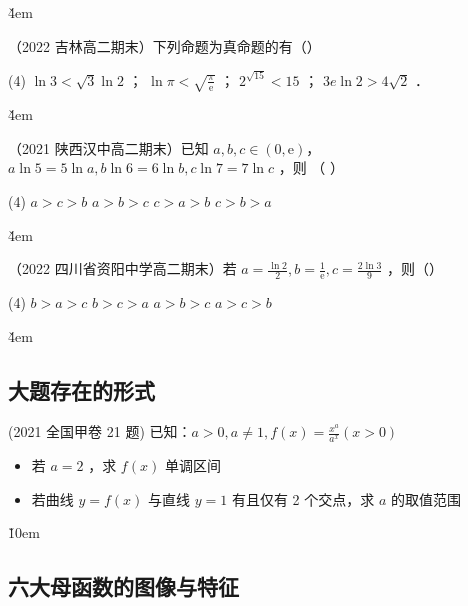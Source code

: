 \v{4em}

\begin{example}
    （2022 吉林高二期末）下列命题为真命题的有（\quad）
    \begin{tasks}(4)
        \task $\ln 3<\sqrt{3} \ln 2$ ；
        \task $\ln \pi<\sqrt{\frac{\pi}{\mathrm{e}}}$ ；
        \task $2^{\sqrt{15}}<15$ ；
        \task $3 e \ln 2>4 \sqrt{2}$ ．
    \end{tasks}
\end{example}

\v{4em}

\begin{example}
    （2021 陕西汉中高二期末）已知 $a, b, c \in (0, \mathrm{e})$，$a \ln 5=5 \ln a, b \ln 6= 6 \ln b, c \ln 7=7 \ln c$ ，则 （ \quad）
    \begin{tasks}(4)
        \task $a>c>b$
        \task $a>b>c$
        \task $c>a>b$
        \task $c>b>a$
    \end{tasks}
\end{example}

\v{4em}

\begin{example}
    （2022 四川省资阳中学高二期末）若 $a=\frac{\ln 2}{2}, b=\frac{1}{\mathrm{e}}, c=\frac{2 \ln 3}{9}$ ，则（\quad ）
    \begin{tasks}(4)
        \task $b>a>c$
        \task $b>c>a$
        \task $a>b>c$
        \task $a>c>b$
    \end{tasks}
\end{example}

\v{4em}

\subsection{大题存在的形式}

\begin{example}
    (2021 全国甲卷 21 题)
    已知：$a>0, a \neq 1, f(x)=\frac{x^a}{a^x}(x>0)$
    \begin{itemize}
        \item 若 $a=2$ ，求 $f(x)$ 单调区间
        \item 若曲线 $y=f(x)$ 与直线 $y=1$ 有且仅有 2 个交点，求 $a$ 的取值范围
    \end{itemize}
\end{example}

\v{10em}

\subsection{六大母函数的图像与特征}

